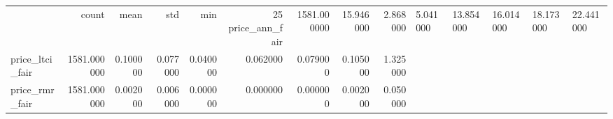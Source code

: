 \begin{tabular}{lrrrrrrrr}
\toprule
 & count & mean & std & min & 25%
\midrule
price_ann_fair & 1581.000000 & 15.946000 & 2.868000 & 5.041000 & 13.854000 & 16.014000 & 18.173000 & 22.441000 \\
price_ltci_fair & 1581.000000 & 0.100000 & 0.077000 & 0.040000 & 0.062000 & 0.079000 & 0.105000 & 1.325000 \\
price_rmr_fair & 1581.000000 & 0.002000 & 0.006000 & 0.000000 & 0.000000 & 0.000000 & 0.002000 & 0.050000 \\
\bottomrule
\end{tabular}
